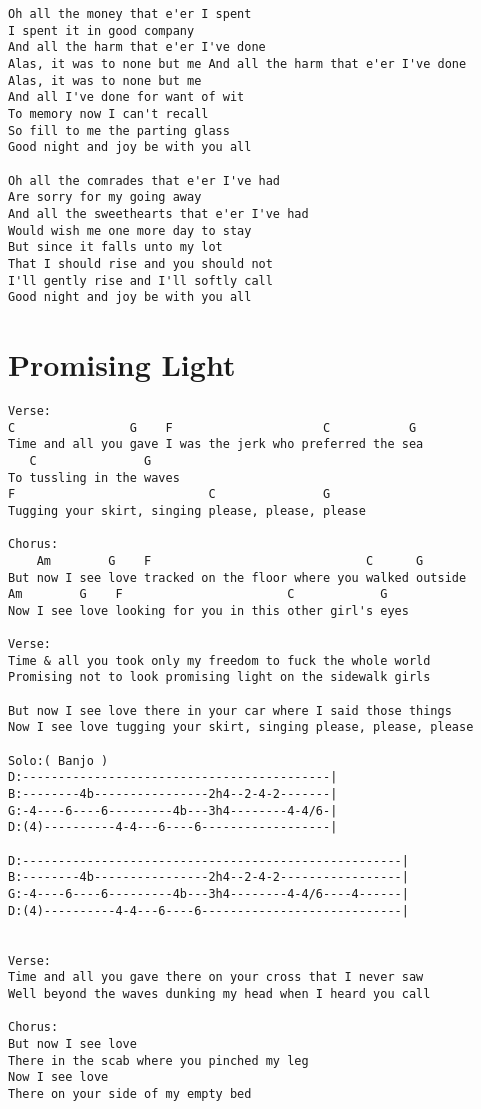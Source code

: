 \documentclass[leqno]{memoir}
\begin{document}
\begin{verbatim}
Oh all the money that e'er I spent
I spent it in good company
And all the harm that e'er I've done
Alas, it was to none but me And all the harm that e'er I've done
Alas, it was to none but me
And all I've done for want of wit
To memory now I can't recall
So fill to me the parting glass
Good night and joy be with you all

Oh all the comrades that e'er I've had
Are sorry for my going away
And all the sweethearts that e'er I've had
Would wish me one more day to stay
But since it falls unto my lot
That I should rise and you should not
I'll gently rise and I'll softly call
Good night and joy be with you all
\end{verbatim}
\newpage

\chapter{Promising Light}
\begin{verbatim}
Verse:
C                G    F                     C           G
Time and all you gave I was the jerk who preferred the sea 
   C               G
To tussling in the waves 
F                           C               G
Tugging your skirt, singing please, please, please 

Chorus:
    Am        G    F                              C      G
But now I see love tracked on the floor where you walked outside 
Am        G    F                       C            G
Now I see love looking for you in this other girl's eyes 

Verse:
Time & all you took only my freedom to fuck the whole world 
Promising not to look promising light on the sidewalk girls 

But now I see love there in your car where I said those things 
Now I see love tugging your skirt, singing please, please, please 

Solo:( Banjo )
D:-------------------------------------------|
B:--------4b----------------2h4--2-4-2-------|
G:-4----6----6---------4b---3h4--------4-4/6-|
D:(4)----------4-4---6----6------------------|

D:-----------------------------------------------------|
B:--------4b----------------2h4--2-4-2-----------------|
G:-4----6----6---------4b---3h4--------4-4/6----4------|
D:(4)----------4-4---6----6----------------------------|


Verse:
Time and all you gave there on your cross that I never saw 
Well beyond the waves dunking my head when I heard you call 

Chorus:
But now I see love 
There in the scab where you pinched my leg 
Now I see love 
There on your side of my empty bed
\end{verbatim}
\newpage
\end{document}
